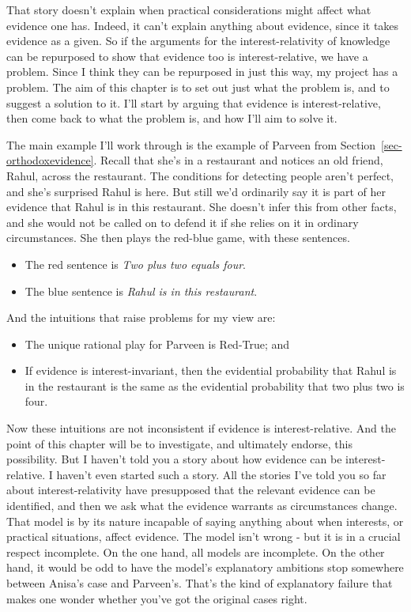 \documentclass[
  12pt,
  letterpaper,
]{scrbook}
\providecommand{\tightlist}{%
  \setlength{\itemsep}{0pt}\setlength{\parskip}{0pt}}\usepackage{longtable,booktabs,array}
\begin{document}
That story doesn't explain when practical considerations might affect
what evidence one has. Indeed, it can't explain anything about evidence,
since it takes evidence as a given. So if the arguments for the
interest-relativity of knowledge can be repurposed to show that evidence
too is interest-relative, we have a problem. Since I think they can be
repurposed in just this way, my project has a problem. The aim of this
chapter is to set out just what the problem is, and to suggest a
solution to it. I'll start by arguing that evidence is
interest-relative, then come back to what the problem is, and how I'll
aim to solve it.

The main example I'll work through is the example of Parveen from
Section~\ref{sec-orthodoxevidence}. Recall that she's in a restaurant
and notices an old friend, Rahul, across the restaurant. The conditions
for detecting people aren't perfect, and she's surprised Rahul is here.
But still we'd ordinarily say it is part of her evidence that Rahul is
in this restaurant. She doesn't infer this from other facts, and she
would not be called on to defend it if she relies on it in ordinary
circumstances. She then plays the red-blue game, with these sentences.

\begin{itemize}
\tightlist
\item
  The red sentence is \emph{Two plus two equals four}.
\item
  The blue sentence is \emph{Rahul is in this restaurant}.
\end{itemize}

And the intuitions that raise problems for my view are:

\begin{itemize}
\tightlist
\item
  The unique rational play for Parveen is Red-True; and
\item
  If evidence is interest-invariant, then the evidential probability
  that Rahul is in the restaurant is the same as the evidential
  probability that two plus two is four.
\end{itemize}

Now these intuitions are not inconsistent if evidence is
interest-relative. And the point of this chapter will be to investigate,
and ultimately endorse, this possibility. But I haven't told you a story
about how evidence can be interest-relative. I haven't even started such
a story. All the stories I've told you so far about interest-relativity
have presupposed that the relevant evidence can be identified, and then
we ask what the evidence warrants as circumstances change. That model is
by its nature incapable of saying anything about when interests, or
practical situations, affect evidence. The model isn't wrong - but it is
in a crucial respect incomplete. On the one hand, all models are
incomplete. On the other hand, it would be odd to have the model's
explanatory ambitions stop somewhere between Anisa's case and Parveen's.
That's the kind of explanatory failure that makes one wonder whether
you've got the original cases right.
\end{document}
